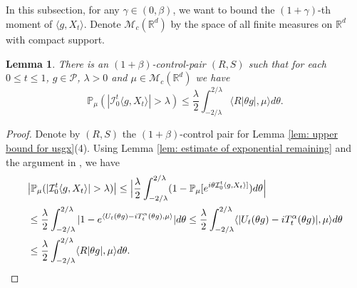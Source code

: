 \documentclass[12pt,oneside,english]{amsart}
\theoremstyle{plain}
\newtheorem{lem}[thm]{Lemma}
\theoremstyle{definition}
\numberwithin{equation}{section}
\begin{document}
\begin{comment}
    Therefore, for any $\mu\in \mathcal M(\mathbb R^d)$ with compact support, $k \in \mathbb{N}$, $\theta \in \mathbb{R}$ and $0\leq s\leq1$, using Jensen's inequality,
\begin{align*}
    &|\varphi_{k,\mu,s}(\theta)-1- \langle Z_{g_k}(s,\cdot, \theta),\mu\rangle|\\
    &\leq |\langle v_{g_k}(s,\cdot,\theta)-i\theta T_s^{\alpha}g_k, \mu \rangle|^2 + \langle |v_{g_k}(s,\cdot,\theta)-\tilde{v}_{g_k}(s,\cdot,\theta)|, \mu \rangle
    \\&\leq \langle |v_{g_k}(s,\cdot,\theta)-i\theta T_s^{\alpha}g_k|^2, \mu \rangle + \langle |v_{g_k}(s,\cdot,\theta)-\tilde{v}_{g_k}(s,\cdot,\theta)|, \mu \rangle
    \\&\leq e^{2\alpha}|C_g\theta e^{(\alpha-\kappa b)k+\alpha}|^{2+2\beta}\langle (\tilde R^g)^2,\mu\rangle + |C_g\theta e^{(\alpha-\kappa b)k}|^{1+2\beta}\langle R^g_1,\mu\rangle.
    \qedhere
\end{align*}
\end{proof}
\end{comment}

\subsection{}

 In this subsection, for any $\gamma \in (0,\beta)$, we want to bound the $(1+\gamma)$-th moment of $\langle g ,X_t \rangle$. Denote $\mathcal{M}_c(\mathbb{R}^d)$ by the space of all finite measures on $\mathbb{R}^d$ with compact support.
\begin{lem}
\label{lem: control pair for P(M>lambda)}
    There is an $(1+\beta)$-control-pair $(R,S)$ such that for each $0\leq t\leq 1$, $g\in \mathcal P$, $\lambda >0$ and $\mu\in \mathcal M_c(\mathbb R^d)$ we have
\[
    \mathbb P_\mu ( |\mathcal{I}_0^t\langle g,X_t\rangle| > \lambda)
    \leq \frac{\lambda}{2}\int_{-2/\lambda}^{2/\lambda}\langle R|\theta g|,\mu\rangle d\theta.
\]
\end{lem}

\begin{proof}
    Denote by $(R,S)$ the $(1+\beta)$-control pair for Lemma \ref{lem: upper bound for usgx}(4).
    Using Lemma \ref{lem: estimate of exponential remaining} and the argument in \cite[Proof of Theorem 3.3.6]{Durrett2010Probability}, we have
\begin{align}
    &\big|\mathbb P_\mu (|\mathcal{I}_0^t\langle g,X_t\rangle| > \lambda)\big|
    \leq \Big|\frac{\lambda}{2}\int_{-2/\lambda}^{2/\lambda}(1 - \mathbb P_\mu[e^{i\theta \mathcal{I}_0^t\langle g,X_t\rangle]})d\theta\Big|
    \\&\leq \frac{\lambda}{2}\int_{-2/\lambda}^{2/\lambda}|1-e^{\langle U_t(\theta g)-iT_t^{\alpha}(\theta g),\mu \rangle}|d\theta
    \leq \frac{\lambda}{2}\int_{-2/\lambda}^{2/\lambda}\langle |U_t(\theta g) - iT_t^\alpha(\theta g)|,\mu\rangle d\theta
    \\&\leq \frac{\lambda}{2}\int_{-2/\lambda}^{2/\lambda}\langle R|\theta g|,\mu\rangle d\theta.
      \qedhere
\end{align}
\end{proof}
\end{document}
